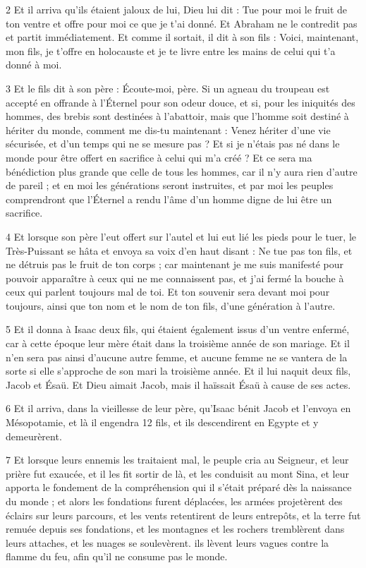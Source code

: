 \par 2 Et il arriva qu'ils étaient jaloux de lui, Dieu lui dit : Tue pour moi le fruit de ton ventre et offre pour moi ce que je t'ai donné. Et Abraham ne le contredit pas et partit immédiatement. Et comme il sortait, il dit à son fils : Voici, maintenant, mon fils, je t'offre en holocauste et je te livre entre les mains de celui qui t'a donné à moi.

\par 3 Et le fils dit à son père : Écoute-moi, père. Si un agneau du troupeau est accepté en offrande à l'Éternel pour son odeur douce, et si, pour les iniquités des hommes, des brebis sont destinées à l'abattoir, mais que l'homme soit destiné à hériter du monde, comment me dis-tu maintenant : Venez hériter d'une vie sécurisée, et d'un temps qui ne se mesure pas ? Et si je n'étais pas né dans le monde pour être offert en sacrifice à celui qui m'a créé ? Et ce sera ma bénédiction plus grande que celle de tous les hommes, car il n'y aura rien d'autre de pareil ; et en moi les générations seront instruites, et par moi les peuples comprendront que l'Éternel a rendu l'âme d'un homme digne de lui être un sacrifice.

\par 4 Et lorsque son père l'eut offert sur l'autel et lui eut lié les pieds pour le tuer, le Très-Puissant se hâta et envoya sa voix d'en haut disant : Ne tue pas ton fils, et ne détruis pas le fruit de ton corps ; car maintenant je me suis manifesté pour pouvoir apparaître à ceux qui ne me connaissent pas, et j'ai fermé la bouche à ceux qui parlent toujours mal de toi. Et ton souvenir sera devant moi pour toujours, ainsi que ton nom et le nom de ton fils, d'une génération à l'autre.

\par 5 Et il donna à Isaac deux fils, qui étaient également issus d'un ventre enfermé, car à cette époque leur mère était dans la troisième année de son mariage. Et il n'en sera pas ainsi d'aucune autre femme, et aucune femme ne se vantera de la sorte si elle s'approche de son mari la troisième année. Et il lui naquit deux fils, Jacob et Ésaü. Et Dieu aimait Jacob, mais il haïssait Ésaü à cause de ses actes.

\par 6 Et il arriva, dans la vieillesse de leur père, qu'Isaac bénit Jacob et l'envoya en Mésopotamie, et là il engendra 12 fils, et ils descendirent en Egypte et y demeurèrent.

\par 7 Et lorsque leurs ennemis les traitaient mal, le peuple cria au Seigneur, et leur prière fut exaucée, et il les fit sortir de là, et les conduisit au mont Sina, et leur apporta le fondement de la compréhension qui il s'était préparé dès la naissance du monde ; et alors les fondations furent déplacées, les armées projetèrent des éclairs sur leurs parcours, et les vents retentirent de leurs entrepôts, et la terre fut remuée depuis ses fondations, et les montagnes et les rochers tremblèrent dans leurs attaches, et les nuages ​​​​se soulevèrent. ils lèvent leurs vagues contre la flamme du feu, afin qu'il ne consume pas le monde.

